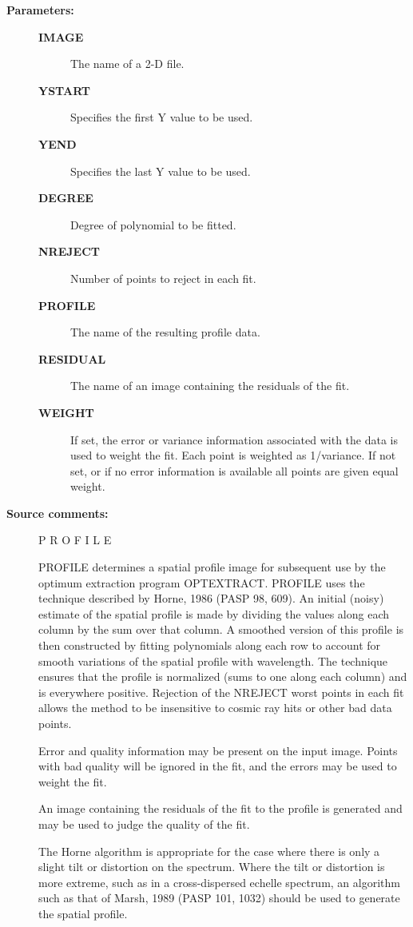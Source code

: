 \begin{description}
\begin{description}
\item [\textbf{Parameters:}]
\begin{description}
\item [\textbf{IMAGE}]
 The name of a 2-D file.
\item [\textbf{YSTART}]
 Specifies the first Y value to be used.
\item [\textbf{YEND}]
 Specifies the last Y value to be used.
\item [\textbf{DEGREE}]
 Degree of polynomial to be fitted.
\item [\textbf{NREJECT}]
 Number of points to reject in each fit.
\item [\textbf{PROFILE}]
 The name of the resulting profile data.
\item [\textbf{RESIDUAL}]
 The name of an image containing the residuals of the fit.
\item [\textbf{WEIGHT}]
 If set, the error or variance information associated with
 the data is used to weight the fit.  Each point is weighted
 as 1/variance.  If not set, or if no error information is
 available all points are given equal weight.
\end{description}

\item [\textbf{Source comments:}]
\begin{terminalv}
 P R O F I L E

 PROFILE determines a spatial profile image for subsequent use
 by the optimum extraction program OPTEXTRACT. PROFILE uses the
 technique described by Horne, 1986 (PASP 98, 609). An initial
 (noisy) estimate of the spatial profile is made by dividing the
 values along each column by the sum over that column. A smoothed
 version of this profile is then constructed by fitting polynomials
 along each row to account for smooth variations of the spatial profile
 with wavelength. The technique ensures that the profile is normalized
 (sums to one along each column) and is everywhere positive. Rejection
 of the NREJECT worst points in each fit allows the method to be
 insensitive to cosmic ray hits or other bad data points.

 Error and quality information may be present on the input image. Points
 with bad quality will be ignored in the fit, and the errors may
 be used to weight the fit.

 An image containing the residuals of the fit to the profile is
 generated and may be used to judge the quality of the fit.

 The Horne algorithm is appropriate for the case where there is only
 a slight tilt or distortion on the spectrum. Where the tilt or
 distortion is more extreme, such as in a cross-dispersed echelle
 spectrum, an algorithm such as that of Marsh, 1989 (PASP 101, 1032)
 should be used to generate the spatial profile.


\end{terminalv}
\end{description}
\end{description}
